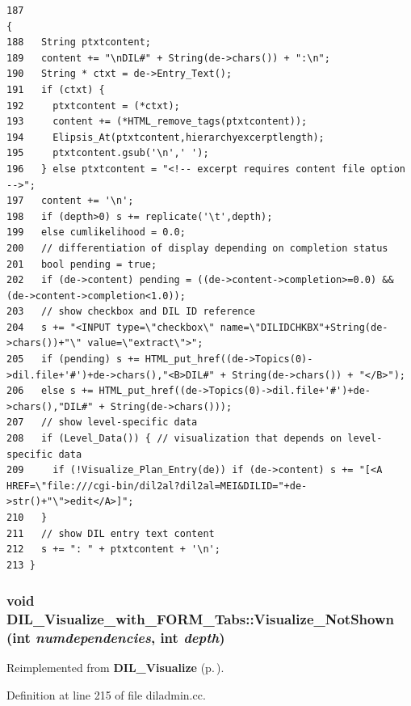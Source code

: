 \footnotesize\begin{verbatim}187                                                                               {
188   String ptxtcontent;
189   content += "\nDIL#" + String(de->chars()) + ":\n";
190   String * ctxt = de->Entry_Text();
191   if (ctxt) {
192     ptxtcontent = (*ctxt);
193     content += (*HTML_remove_tags(ptxtcontent));
194     Elipsis_At(ptxtcontent,hierarchyexcerptlength);
195     ptxtcontent.gsub('\n',' ');
196   } else ptxtcontent = "<!-- excerpt requires content file option -->";
197   content += '\n';
198   if (depth>0) s += replicate('\t',depth);
199   else cumlikelihood = 0.0;
200   // differentiation of display depending on completion status
201   bool pending = true;
202   if (de->content) pending = ((de->content->completion>=0.0) && (de->content->completion<1.0));
203   // show checkbox and DIL ID reference
204   s += "<INPUT type=\"checkbox\" name=\"DILIDCHKBX"+String(de->chars())+"\" value=\"extract\">";
205   if (pending) s += HTML_put_href((de->Topics(0)->dil.file+'#')+de->chars(),"<B>DIL#" + String(de->chars()) + "</B>");
206   else s += HTML_put_href((de->Topics(0)->dil.file+'#')+de->chars(),"DIL#" + String(de->chars()));
207   // show level-specific data
208   if (Level_Data()) { // visualization that depends on level-specific data
209     if (!Visualize_Plan_Entry(de)) if (de->content) s += "[<A HREF=\"file:///cgi-bin/dil2al?dil2al=MEI&DILID="+de->str()+"\">edit</A>]";
210   }
211   // show DIL entry text content
212   s += ": " + ptxtcontent + '\n';
213 }
\end{verbatim}\normalsize 
{}
\subsubsection{\setlength{\rightskip}{0pt plus 5cm}void DIL\_\-Visualize\_\-with\_\-FORM\_\-Tabs::Visualize\_\-Not\-Shown (int {\em numdependencies}, int {\em depth})\hspace{0.3cm}{\tt  [virtual]}}\label{classDIL__Visualize__with__FORM__Tabs_a3}




Reimplemented from {\bf DIL\_\-Visualize} {\rm (p.\,\pageref{classDIL__Visualize_a6})}.

Definition at line 215 of file diladmin.cc.


